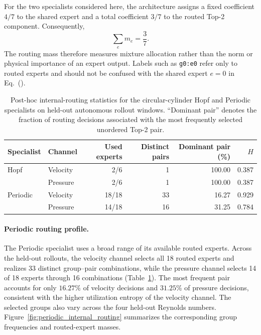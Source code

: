 For the two specialists considered here, the architecture assigns a fixed coefficient $4/7$ to the shared expert and a total coefficient $3/7$ to the routed Top-2 component. Consequently,
\begin{equation}
  \sum_e m_e=\frac{3}{7}.
\end{equation}
The routing mass therefore measures mixture allocation rather than the norm or physical importance of an expert output.
Labels such as \texttt{g0:e0} refer only to routed experts and should not be confused with the shared expert $e=0$ in
Eq.~().

\begin{table}[htbp]
\centering
\caption{
Post-hoc internal-routing statistics for the circular-cylinder Hopf and Periodic specialists on held-out autonomous rollout windows. ``Dominant pair'' denotes the fraction of routing decisions associated with the most frequently selected unordered Top-2 pair.
}
\label{tab:internal_routing_summary}
\small
\setlength{\tabcolsep}{5pt}
\begin{tabular}{@{}llrrrr@{}}
\toprule
Specialist & Channel & Used experts & Distinct pairs & Dominant pair (\%) & $H$ \\
\midrule
Hopf & Velocity & 2/6 & 1 & 100.00 & 0.387 \\
     & Pressure & 2/6 & 1 & 100.00 & 0.387 \\
\addlinespace
Periodic & Velocity & 18/18 & 33 & 16.27 & 0.929 \\
         & Pressure & 14/18 & 16 & 31.25 & 0.784 \\
\bottomrule
\end{tabular}
\end{table}

\paragraph{Periodic routing profile.}
The Periodic specialist uses a broad range of its available routed experts. Across the held-out rollouts, the velocity channel selects all 18 routed experts and realizes 33 distinct group--pair combinations, while the pressure channel selects 14 of 18 experts through 16 combinations (Table~\ref{tab:internal_routing_summary}). The most frequent pair accounts for only $16.27\%$ of velocity decisions and $31.25\%$ of pressure decisions, consistent with the higher utilization entropy of the velocity channel. The selected groups also vary across the four held-out Reynolds numbers.
Figure~\ref{fig:periodic_internal_routing} summarizes the corresponding group frequencies and routed-expert masses.


